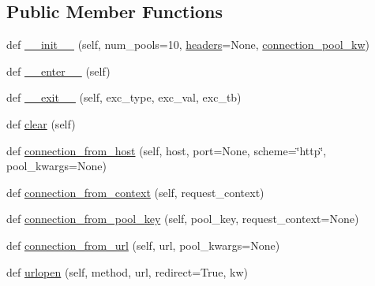 \subsection*{Public Member Functions}
\begin{DoxyCompactItemize}
\item 
def \hyperlink{classpip_1_1__vendor_1_1urllib3_1_1poolmanager_1_1PoolManager_ae2f3332cce2d95c424164d3c03851a73}{\+\_\+\+\_\+init\+\_\+\+\_\+} (self, num\+\_\+pools=10, \hyperlink{classpip_1_1__vendor_1_1urllib3_1_1request_1_1RequestMethods_a507ade459b427bd81a5a8849563702e3}{headers}=None, \hyperlink{classpip_1_1__vendor_1_1urllib3_1_1poolmanager_1_1PoolManager_a509374901e1f086853c6df9928b7312a}{connection\+\_\+pool\+\_\+kw})
\item 
def \hyperlink{classpip_1_1__vendor_1_1urllib3_1_1poolmanager_1_1PoolManager_a2b2f223bf1d4ce8dabfdcc7347333eb6}{\+\_\+\+\_\+enter\+\_\+\+\_\+} (self)
\item 
def \hyperlink{classpip_1_1__vendor_1_1urllib3_1_1poolmanager_1_1PoolManager_ab3a3ef8fb5ba2ab1a62c4d4cbe336440}{\+\_\+\+\_\+exit\+\_\+\+\_\+} (self, exc\+\_\+type, exc\+\_\+val, exc\+\_\+tb)
\item 
def \hyperlink{classpip_1_1__vendor_1_1urllib3_1_1poolmanager_1_1PoolManager_a293a4e1145fa83883ca5a0a83c9e2a0d}{clear} (self)
\item 
def \hyperlink{classpip_1_1__vendor_1_1urllib3_1_1poolmanager_1_1PoolManager_a7e530a63470af62cc2ce9c7d5ceb4402}{connection\+\_\+from\+\_\+host} (self, host, port=None, scheme=\char`\"{}http\char`\"{}, pool\+\_\+kwargs=None)
\item 
def \hyperlink{classpip_1_1__vendor_1_1urllib3_1_1poolmanager_1_1PoolManager_a1b1cc75e0e4df72c7190c1dc85cfb8b3}{connection\+\_\+from\+\_\+context} (self, request\+\_\+context)
\item 
def \hyperlink{classpip_1_1__vendor_1_1urllib3_1_1poolmanager_1_1PoolManager_aec90b429d0fd092fe7baaeef721088e4}{connection\+\_\+from\+\_\+pool\+\_\+key} (self, pool\+\_\+key, request\+\_\+context=None)
\item 
def \hyperlink{classpip_1_1__vendor_1_1urllib3_1_1poolmanager_1_1PoolManager_ad3a3b301f8ce97a6a6904ac76dc31bd8}{connection\+\_\+from\+\_\+url} (self, url, pool\+\_\+kwargs=None)
\item 
def \hyperlink{classpip_1_1__vendor_1_1urllib3_1_1poolmanager_1_1PoolManager_a544250cb00f6ef92d7a724790391a985}{urlopen} (self, method, url, redirect=True, kw)
\end{DoxyCompactItemize}
